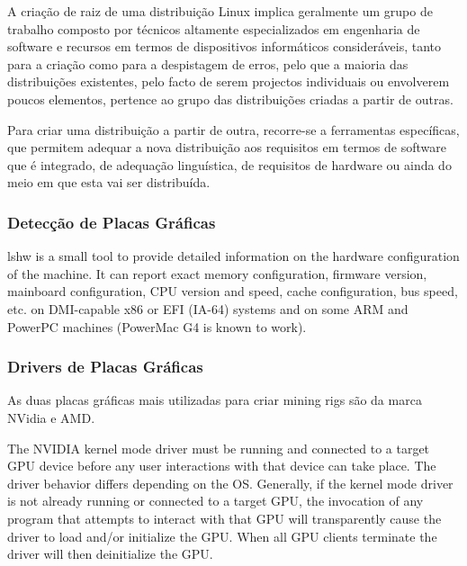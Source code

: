 \documentclass[
	article,			%
	12pt,				%
	openright,			%
	oneside,			%
	a4paper,			%
	chapter=TITLE,		%
	section=TITLE,		%
	subsection=TITLE,	%
	subsubsection=TITLE,%
	subsubsubsection=TITLE, %
	english,			%
	brazil,				%
	]{abntex2}
\begin{document}
A criação de raiz de uma distribuição Linux implica geralmente um grupo de trabalho composto por técnicos altamente especializados em engenharia de software e recursos em termos de dispositivos informáticos consideráveis, tanto para a criação como para a despistagem de erros, pelo que a maioria das distribuições existentes, pelo facto de serem projectos individuais ou envolverem poucos elementos, pertence ao grupo das distribuições criadas a partir de outras.

Para criar uma distribuição a partir de outra, recorre-se a ferramentas específicas, que permitem adequar a nova distribuição aos requisitos em termos de software que é integrado, de adequação linguística, de requisitos de hardware ou ainda do meio em que esta vai ser distribuída.

\cite{Nunes2009}

\subsubsection{Detecção de Placas Gráficas}


lshw is a small tool to provide detailed information on the hardware configuration of the machine. It can report exact memory configuration, firmware version, mainboard configuration, CPU version and speed, cache configuration, bus speed, etc. on DMI-capable x86 or EFI (IA-64) systems and on some ARM and PowerPC machines (PowerMac G4 is known to work).

\cite{Vincent2018}

\subsubsection{Drivers de Placas Gráficas}

As duas placas gráficas mais utilizadas para criar mining rigs são da marca NVidia e AMD.

\cite{CoinMiningRigs2018}


The NVIDIA kernel mode driver must be running and connected to a target GPU device before any user interactions with that device can take place. The driver behavior differs depending on the OS. Generally, if the kernel mode driver is not already running or connected to a target GPU, the invocation of any program that attempts to interact with that GPU will transparently cause the driver to load and/or initialize the GPU. When all GPU clients terminate the driver will then deinitialize the GPU.
\end{document}
